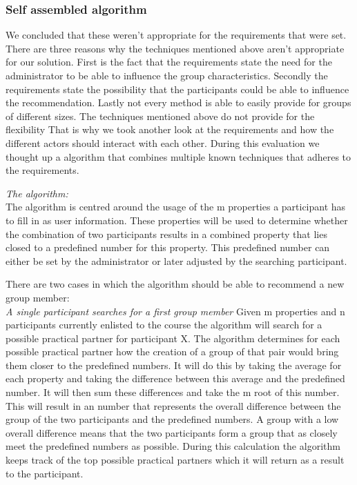 \documentclass[]{article}
\begin{document}
\subsubsection{Self assembled algorithm}
We concluded that these weren't appropriate for the requirements that were set.
There are three reasons why the techniques mentioned above aren't appropriate for our solution.
First is the fact that the requirements state the need for the administrator to be able to influence the group characteristics.
Secondly the requirements state the possibility that the participants could be able to influence the recommendation.
Lastly not every method is able to easily provide for groups of different sizes.
The techniques mentioned above do not provide for the flexibility 
That is why we took another look at the requirements and how the different actors should interact with each other.
During this evaluation we thought up a algorithm that combines multiple known techniques that adheres to the requirements.

\emph{The algorithm:}\\
The algorithm is centred around the usage of the m properties a participant has to fill in as user information.
These properties will be used to determine whether the combination of two participants results in a combined property that lies closed to a predefined number for this property.
This predefined number can either be set by the administrator or later adjusted by the searching participant.

There are two cases in which the algorithm should be able to recommend a new group member:\\
\emph{A single participant searches for a first group member}
Given m properties and n participants currently enlisted to the course the algorithm will search for a possible practical partner for participant X.
The algorithm determines for each possible practical partner how the creation of a group of that pair would bring them closer to the predefined numbers.
It will do this by taking the average for each property and taking the difference between this average and the predefined number.
It will then sum these differences and take the m root of this number.
This will result in an number that represents the overall difference between the group of the two participants and the predefined numbers.
A group with a low overall difference means that the two participants form a group that as closely meet the predefined numbers as possible.
During this calculation the algorithm keeps track of the top possible practical partners which it will return as a result to the participant.
\end{document}
